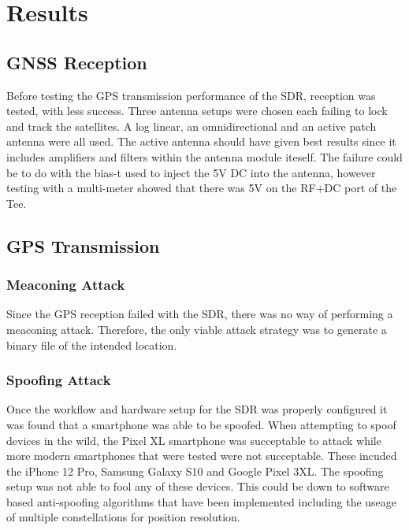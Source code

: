 
\chapter{Results} %

\label{Chapter5} %


\section{GNSS Reception}
Before testing the GPS transmission performance of the SDR, reception was tested, with less success. Three antenna setups were chosen each failing to lock and track the
satellites. A log linear, an omnidirectional and an active patch antenna were all used. The active antenna should have given best results since it includes amplifiers and
filters within the antenna module iteself. The failure could be to do with the bias-t used to inject the 5V DC into the antenna, however testing with a multi-meter showed
that there was 5V on the RF+DC port of the Tee.



\section{GPS Transmission}

\subsection{Meaconing Attack}
Since the GPS reception failed with the SDR, there was no way of performing a meaconing attack. Therefore, the only viable attack strategy was to generate a binary file
of the intended location. 

\subsection{Spoofing Attack}
Once the workflow and hardware setup for the SDR was properly configured it was found that a smartphone was able to be spoofed.
When attempting to spoof devices in the wild, the Pixel XL smartphone was succeptable to attack while more modern smartphones that were tested were not succeptable. These
incuded the iPhone 12 Pro, Samsung Galaxy S10 and Google Pixel 3XL. The spoofing setup was not able to fool any of these devices. This could be down to software based
anti-spoofing algorithms that have been implemented including the useage of multiple constellations for position resolution.

